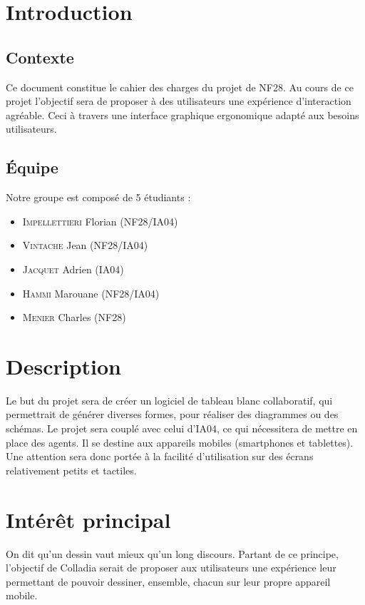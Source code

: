 \documentclass[a4paper,11pt]{article}
\begin{document}


\newpage
\section{Introduction}

\subsection{Contexte}
Ce document constitue le cahier des charges du projet de NF28. Au cours de ce projet l'objectif sera de proposer à des utilisateurs une expérience d'interaction agréable. Ceci à travers une interface graphique ergonomique adapté aux besoins utilisateurs.

\subsection{Équipe}
Notre groupe est composé de 5 étudiants :
\begin{itemize}
\item \textsc{Impellettieri} Florian (NF28/IA04)
\item \textsc{Vintache} Jean (NF28/IA04)
\item \textsc{Jacquet} Adrien (IA04)
\item \textsc{Hammi} Marouane (NF28/IA04)
\item \textsc{Menier} Charles (NF28)
\end{itemize}



\section{Description}
Le but du projet sera de créer un logiciel de tableau blanc collaboratif, qui permettrait de générer diverses formes, pour réaliser des diagrammes ou des schémas.
Le projet sera couplé avec celui d'IA04, ce qui nécessitera de mettre en place des agents. Il se destine aux appareils mobiles (smartphones et tablettes). Une attention sera donc portée à la facilité d'utilisation sur des écrans relativement petits et tactiles.



\section{Intérêt principal}
On dit qu'un dessin vaut mieux qu'un long discours. Partant de ce principe, l'objectif de Colladia serait de proposer aux utilisateurs une expérience leur permettant de pouvoir dessiner, ensemble, chacun sur leur propre appareil mobile. 
\end{document}
